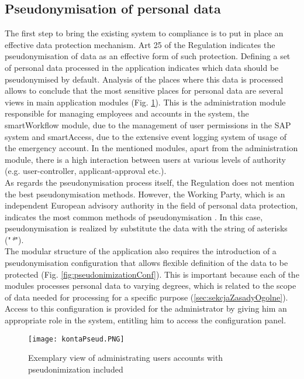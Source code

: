 \documentclass[en, noamssymb]{mgr}
\begin{document}
\subsection{Pseudonymisation of personal data}

The first step to bring the existing system to compliance is to put in place an effective data protection mechanism. Art 25 of the Regulation indicates the pseudonymisation of data as an effective form of such protection. Defining a set of personal data processed in the application indicates which data should be pseudonymised by default. Analysis of the places where this data is processed allows to conclude that the most sensitive places for personal data are several views in main application modules (Fig. \ref{fig:accountsAdministrationPseudonimized}). This is the administration module responsible for managing employees and accounts in the system, the smartWorkflow module, due to the management of user permissions in the SAP system and smartAccess, due to the extensive event logging system of usage of the emergency account. In the mentioned modules, apart from the administration module, there is a high interaction between users at various levels of authority (e.g. user-controller, applicant-approval etc.).\\
\indent As regards the pseudonymisation process itself, the Regulation does not mention the best pseudonymisation methods. However, the Working Party, which is an independent European advisory authority in the field of personal data protection, indicates the most common methods of pseudonymisation \cite{pseudonimizacja_2017}. In this case, pseudonymisation is realized by substitute the data with the string of asterisks ("\textit{*}").\\
\indent The modular structure of the application also requires the introduction of a pseudonymisation configuration that allows flexible definition of the data to be protected (Fig. \ref{fig:pseudonimizationConf}). This is important because each of the modules processes personal data to varying degrees, which is related to the scope of data needed for processing for a specific purpose (\ref{sec:sekcjaZasadyOgolne}). Access to this configuration is provided for the administrator by giving him an appropriate role in the system, entitling him to access the configuration panel.

\begin{figure}[H]
	\centering
	\texttt{[image: kontaPseud.PNG]}
	\caption[Exemplary view of administrating users accounts with pseudonimization included]{Exemplary view of administrating users accounts with pseudonimization included}
	\label{fig:accountsAdministrationPseudonimized}
\end{figure}
\end{document}

